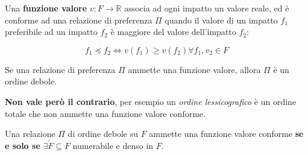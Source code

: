 \documentclass[\main/main.tex]{subfiles}
\begin{document}
\vspace{5mm}

Una \textbf{funzione valore} $v: F \rightarrow \mathbb{R}$ associa ad ogni impatto un valore reale, ed è conforme ad una relazione di preferenza $\Pi$ quando il valore di un impatto $f_1$ preferibile ad un impatto $f_2$ è maggiore del valore dell'impatto $f_2$:

\[
	f_1 \preceq f_2 \Leftrightarrow v(f_1) \geq v(f_2) \forall f_1, v_2 \in F
\]

Se una relazione di preferenza $\Pi$ ammette una funzione valore, allora $\Pi$ è un ordine debole.

\textbf{Non vale però il contrario}, per esempio un \textit{ordine lessicografico} è un ordine totale che non ammette una funzione valore conforme.

Una relazione $\Pi$ di ordine debole su $F$ ammette una funzione valore conforme \textbf{se e solo se} $\exists \tilde{F} \subseteq F$ numerabile e denso in $F$.
\end{document}
